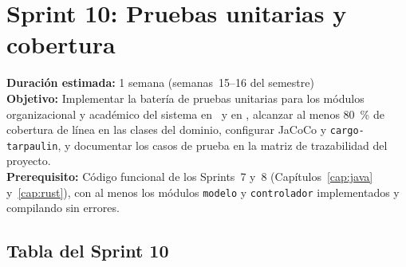 \section*{Sprint 10: Pruebas unitarias y cobertura}
\label{sprint:10}

\begin{tcolorbox}[sprintBox, title={Sprint 10 --- Pruebas unitarias y cobertura}]
  \textbf{Duración estimada:} 1 semana (semanas~15--16 del semestre)\\
  \textbf{Objetivo:} Implementar la batería de pruebas unitarias para los módulos
  organizacional y académico del sistema en \java\ y en \rust, alcanzar al menos
  80~\% de cobertura de línea en las clases del dominio, configurar JaCoCo y
  \texttt{cargo-tarpaulin}, y documentar los casos de prueba en la matriz de trazabilidad
  del proyecto.\\
  \textbf{Prerequisito:} Código funcional de los Sprints~7 y~8 (Capítulos~\ref{cap:java}
  y~\ref{cap:rust}), con al menos los módulos \texttt{modelo} y \texttt{controlador}
  implementados y compilando sin errores.
\end{tcolorbox}

\bigskip

\subsection*{Tabla del Sprint 10}

